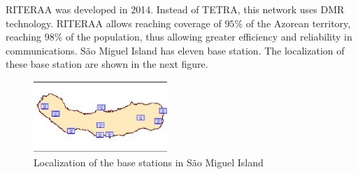 \documentclass[letterpaper, 10 pt, conference]{ieeeconf}  %
\begin{document}
RITERAA was developed in 2014. Instead of TETRA, this network uses DMR technology. RITERAA allows reaching coverage of $ 95 \% $ of the Azorean territory, reaching $ 98 \% $ of the population, thus allowing greater efficiency and reliability in communications. São Miguel Island has eleven base station. The localization of these base station are shown in the next figure. 
\begin{figure}[h]
    \centering
    \includegraphics[width=0.45\textwidth]{riteraaestacoesbase.jpg}
    \caption{Localization of the base stations in São Miguel Island}
    \label{fig:RITERAA}
\end{figure}
\FloatBarrier
\end{document}
